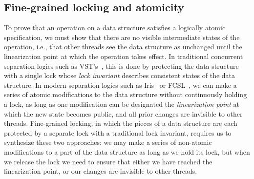 \documentclass[acmsmall,screen]{acmart}\settopmatter{printfolios=true}
\begin{document}

\subsection{Fine-grained locking and atomicity}
\label{atomicity}

To prove that an operation on a data structure satisfies a logically atomic specification, we must show that there are no visible intermediate states of the operation, i.e., that other threads see the data structure as unchanged until the linearization point at which the operation takes effect. In traditional concurrent separation logics such as VST's~\cite{oraclesematic}, this is done by protecting the data structure with a single lock whose \emph{lock invariant} describes consistent states of the data structure. In modern separation logics such as Iris~\cite{iris} or FCSL~\cite{fcsl}, we can make a series of atomic modifications to the data structure without continuously holding a lock, as long as one modification can be designated the \emph{linearization point} at which the new state becomes public, and all prior changes are invisible to other threads. Fine-grained locking, in which the pieces of a data structure are each protected by a separate lock with a traditional lock invariant, requires us to synthesize these two approaches: we may make a series of non-atomic modifications to a part of the data structure as long as we hold its lock, but when we release the lock we need to ensure that either we have reached the linearization point, or our changes are invisible to other threads.
\end{document}
